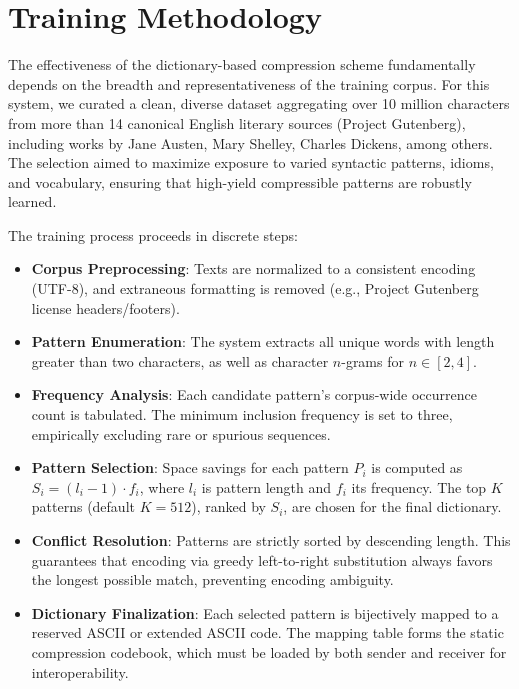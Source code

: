 \documentclass[12pt,openany]{article}
\theoremstyle{definition}
\theoremstyle{definition}
\theoremstyle{definition}
\begin{document}
\section*{Training Methodology}

The effectiveness of the dictionary-based compression scheme fundamentally depends on the breadth and representativeness of the training corpus. For this system, we curated a clean, diverse dataset aggregating over 10 million characters from more than 14 canonical English literary sources (Project Gutenberg), including works by Jane Austen, Mary Shelley, Charles Dickens, among others. The selection aimed to maximize exposure to varied syntactic patterns, idioms, and vocabulary, ensuring that high-yield compressible patterns are robustly learned.

The training process proceeds in discrete steps:

\begin{itemize}
    \item \textbf{Corpus Preprocessing}: Texts are normalized to a consistent encoding (UTF-8), and extraneous formatting is removed (e.g., Project Gutenberg license headers/footers).
    \item \textbf{Pattern Enumeration}: The system extracts all unique words with length greater than two characters, as well as character $n$-grams for $n \in [2,4]$.
    \item \textbf{Frequency Analysis}: Each candidate pattern’s corpus-wide occurrence count is tabulated. The minimum inclusion frequency is set to three, empirically excluding rare or spurious sequences.
    \item \textbf{Pattern Selection}: Space savings for each pattern $P_i$ is computed as $S_i = (l_i - 1) \cdot f_i$, where $l_i$ is pattern length and $f_i$ its frequency. The top $K$ patterns (default $K = 512$), ranked by $S_i$, are chosen for the final dictionary.
    \item \textbf{Conflict Resolution}: Patterns are strictly sorted by descending length. This guarantees that encoding via greedy left-to-right substitution always favors the longest possible match, preventing encoding ambiguity.
    \item \textbf{Dictionary Finalization}: Each selected pattern is bijectively mapped to a reserved ASCII or extended ASCII code. The mapping table forms the static compression codebook, which must be loaded by both sender and receiver for interoperability.
\end{itemize}
\end{document}
